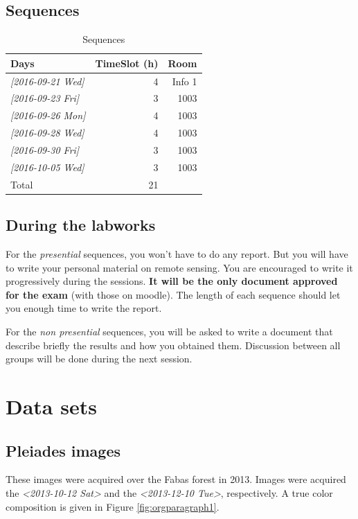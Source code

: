 \documentclass[a4paper,11pt,DIV=18]{scrartcl}
\begin{document}
\subsection{Sequences}
\label{sec:orgheadline7}
\begin{table}[htb]
\caption{Sequences}
\centering
\begin{tabular}{lrr}
\toprule
Days & TimeSlot (h) & Room\\
\midrule
\textit{[2016-09-21 Wed]} & 4 & Info 1\\
\textit{[2016-09-23 Fri]} & 3 & 1003\\
\textit{[2016-09-26 Mon]} & 4 & 1003\\
\textit{[2016-09-28 Wed]} & 4 & 1003\\
\textit{[2016-09-30 Fri]} & 3 & 1003\\
\textit{[2016-10-05 Wed]} & 3 & 1003\\
\midrule
Total & 21 & \\
\bottomrule
\end{tabular}
\end{table}

\subsection{During the labworks}
\label{sec:orgheadline8}
For the \emph{presential} sequences, you won't have to do any report. But you
will have to  write your personal material on remote  sensing. You are
encouraged to write it progressively  during the sessions.  \textbf{It will be
the only  document approved for the  exam} (with those on  moodle). The
length  of each  sequence  should let  you enough  time  to write  the
report.

For  the \emph{non  presential}  sequences,  you will  be  asked  to write  a
document  that  describe briefly  the  results  and how  you  obtained
them.  Discussion between  all groups  will  be done  during the  next
session.
\section{Data sets}
\label{sec:orgheadline14}
\subsection{Pleiades images}
\label{sec:orgheadline10}
These images were acquired over the  Fabas forest in 2013. Images were
acquired   the   \textit{<2013-10-12 Sat>    }    and   the   \textit{<2013-12-10 Tue>},
respectively. A true color composition is given in Figure \ref{fig:orgparagraph1}.
\end{document}
